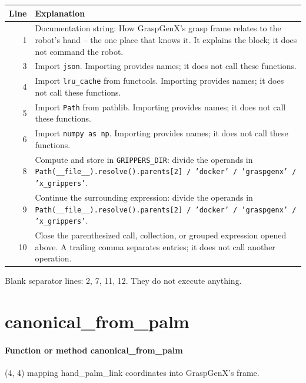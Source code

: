 \documentclass[11pt,a4paper]{book}
\begin{document}
\begin{longtable}{r p{}}

\textbf{Line} & \textbf{Explanation} \\ \hline \endhead

1 & Documentation string: How GraspGenX's grasp frame relates to the robot's hand -- the one place that knows it. It explains the block; it does not command the robot. \\

3 & Import \texttt{json}. Importing provides names; it does not call these functions. \\

4 & Import \texttt{lru\_cache} from functools. Importing provides names; it does not call these functions. \\

5 & Import \texttt{Path} from pathlib. Importing provides names; it does not call these functions. \\

6 & Import \texttt{numpy as np}. Importing provides names; it does not call these functions. \\

8 & Compute and store in \texttt{GRIPPERS\_DIR}: divide the operands in \texttt{Path(\_\_file\_\_).resolve().parents[2] / 'docker' / 'graspgenx' / 'x\_grippers'}.  \\

9 & Continue the surrounding expression: divide the operands in \texttt{Path(\_\_file\_\_).resolve().parents[2] / 'docker' / 'graspgenx' / 'x\_grippers'}. \\

10 & Close the parenthesized call, collection, or grouped expression opened above. A trailing comma separates entries; it does not call another operation. \\

\end{longtable}

Blank separator lines: 2, 7, 11, 12. They do not execute anything.

\section{canonical\_from\_palm}

\paragraph{Function or method canonical\_from\_palm}
(4, 4) mapping hand\_palm\_link coordinates into GraspGenX's frame.
\end{document}

